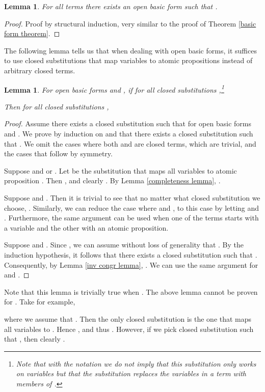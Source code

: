 \documentclass[a4paper,twoside,openright]{report}
\newtheorem{lem}[theorem]{Lemma}
\begin{document}
\begin{lem}\label{open basic form lem}
For all terms  there exists an open basic form  such that .
\end{lem}
\begin{proof}
Proof by structural induction, very similar to the proof of Theorem \ref{basic form theorem}.
\end{proof}

The following lemma tells us that when dealing with open basic forms, it suffices to use closed substitutions that map variables to atomic propositions instead of arbitrary closed terms.

\begin{lem}\label{substitution lemma}
For open basic forms  and , if for all closed substitutions ,\footnote{Note that with the notation  we do not imply that this substitution only works on variables but that the substitution replaces the variables in a term with members of .}

Then for all closed substitutions ,

\end{lem}
\begin{proof}
Assume there exists a closed substitution  such that  for open basic forms  and . We prove by induction on  and  that there exists a closed substitution  such that . We omit the cases where both  and  are closed terms, which are trivial, and the cases that follow by symmetry.

Suppose  and  or . Let  be the substitution that maps all variables to atomic proposition . Then , and clearly . By Lemma \ref{completeness lemma}, .

Suppose  and . Then it is trivial to see that no matter what closed substitution  we choose, . Similarly, we can reduce the case where  and , to this case by letting  and . Furthermore, the same argument can be used when one of the terms starts with a variable and the other with an atomic proposition.

Suppose  and . Since , we can assume without loss of generality that . By the induction hypothesis, it follows that there exists a closed substitution  such that . Consequently, by Lemma \ref{inv congr lemma}, . We can use the same argument for  and .
\end{proof}

Note that this lemma is trivially true when . The above lemma cannot be proven for . Take for example,

where we assume that . Then the only closed substitution  is the one that maps all variables to . Hence , and thus . However, if we pick closed substitution  such that , then clearly .
\end{document}
